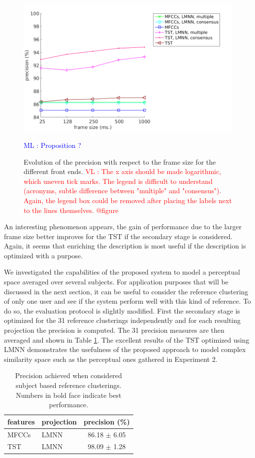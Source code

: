 \documentclass{article}
\newcommand{\ml}[1]{\textcolor{blue}{ML : #1}}
\newcommand{\vl}[1]{\textcolor{red}{VL : #1}}
\begin{document}
\begin{figure}
\center
\includegraphics[width = \textwidth]{figures/frame.png}
\caption{Evolution of the precision with respect to the frame size for the different front ends.
\vl{The x axis should be made logarithmic, which uneven tick marks.
The legend is difficult to understand (acronyms, subtle difference between "multiple" and "consensus").
Again, the legend box could be removed after placing the labels next to the lines themselves. @figure}}
\ml{Proposition ?}
\label{fig:frame}
\end{figure}

An interesting phenomenon appears, the gain of performance due to the larger frame size better improves for the TST if the secondary stage is considered. Again, it seems that enriching the description is most useful if the description is optimized with a purpose.

We investigated the capabilities of the proposed system to model a perceptual space averaged over several subjects. For application purposes that will be discussed in the next section, it can be useful to consider the reference clustering of only one user and see if the system perform well with this kind of reference. To do so, the evaluation protocol is slightly modified. First the secondary stage is optimized for the 31 reference clusterings independently and for each resulting projection the precision is computed. The 31 precision measures are then averaged and shown in Table \ref{tab:res2}. The excellent results of the TST optimized using LMNN demonstrates the usefulness of the proposed approach to model complex similarity space such as the perceptual ones gathered in Experiment 2.


\begin{table}
  \caption{Precision achieved when considered subject based reference clusterings. Numbers in bold face indicate best performance.}
  \label{tab:res2}
  \begin{center}
\begin{tabular}{llc}
features & projection & precision (\%) \\
  \hline
MFCCs & LMNN & 86.18 $\pm$ 6.05 \\
TST & LMNN & 98.09 $\pm$ 1.28 \\
\end{tabular}
\end{center}
\end{table}
\end{document}
